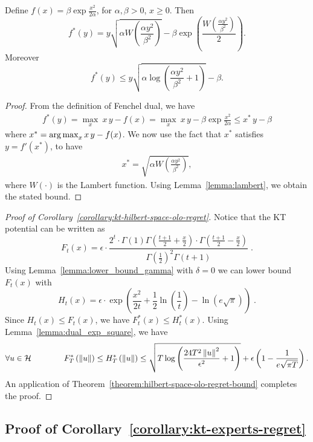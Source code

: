 \begin{lemma}
\label{lemma:dual_exp_square}
Define $f(x)= \beta \exp\frac{x^2}{2 \alpha}$, for $\alpha,\beta>0$, $x\geq0$. Then
\[
f^*(y)=y \sqrt{\alpha W\left(\frac{\alpha y^2}{\beta^2}\right)} - \beta \exp\left(\frac{W\left(\frac{\alpha y^2}{\beta^2}\right)}{2}\right).
\]
Moreover
\[
f^*(y) \leq y \sqrt{\alpha \log \left(\frac{\alpha y^2}{\beta^2} +1 \right)} - \beta.
\]
\end{lemma}
%
\begin{proof}
From the definition of Fenchel dual, we have
\begin{align*}
f^*(y)= \max_{x} \  x\, y - f(x) = \max_{x} \  x\, y - \beta \exp\frac{x^2}{2 \alpha} \leq x^*\,y -\beta
\end{align*}
where $x^*= \operatorname*{arg\,max}_{x} x\, y - f(x)$. We now use the fact that $x^*$ satisfies $y = f'(x^*)$, to have
\begin{align*}
x^*=\sqrt{\alpha W\left(\frac{\alpha y^2}{\beta^2}\right)},
\end{align*}
where $W(\cdot)$ is the Lambert function.
Using Lemma~\ref{lemma:lambert}, we obtain the stated bound.
\end{proof}


\begin{proof}[Proof of Corollary~\ref{corollary:kt-hilbert-space-olo-regret}]
Notice that the KT potential can be written as
\[
F_t(x) = \epsilon \cdot \frac{2^t \cdot \Gamma(1) \Gamma \left(\frac{t+1}{2} + \frac{x}{2} \right) \cdot \Gamma \left(\frac{t+1}{2} - \frac{x}{2} \right)}{ \Gamma(\frac{1}{2})^2 \Gamma(t+1)} \; .
\]
Using Lemma~\ref{lemma:lower_bound_gamma} with $\delta = 0$ we can lower bound $F_t(x)$ with
\[
H_t(x) = \epsilon \cdot \exp\left(\frac{x^2}{2t} + \frac{1}{2} \ln \left(\frac{1}{t} \right) - \ln (e \sqrt{\pi}) \right) \; .
\]
Since $H_t(x) \le F_t(x)$, we have $F^*_t(x) \le H_t^*(x)$. Using Lemma~\ref{lemma:dual_exp_square}, we have
\[
\forall u \in \mathcal{H} \qquad \qquad
F^*_T\left(\left\|{u}\right\|\right)
\le H^*_T\left(\left\|{u}\right\|\right)
\le \sqrt{T \log \left(\frac{24 T^2 \left\|{u}\right\|^2}{\epsilon^2} +1 \right)}+\epsilon\left(1-\frac{1}{e \sqrt{ \pi T}}\right).
\]
An application of Theorem~\ref{theorem:hilbert-space-olo-regret-bound} completes the proof.
\end{proof}

\subsection{Proof of Corollary~\ref{corollary:kt-experts-regret}}

